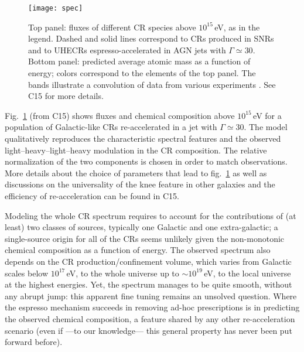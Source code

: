 \documentclass[3p,times,twocolumn]{elsarticle}
\begin{document}
\begin{figure}[t]
\begin{center}
\texttt{[image: spec]}
\caption{Top panel: fluxes of different CR species above $10^{15}$\,eV, as in the legend. 
Dashed and solid lines correspond to CRs produced in SNRs and to UHECRs espresso-accelerated in AGN jets with $\Gamma\simeq 30$.
Bottom panel: predicted average atomic mass as a function of energy; colors correspond to the elements of the top panel.
The bands illustrate a convolution of data from various experiments \citep[][and refs.\ therein]{KU12,GST13,Auger14a,Auger14b}.
See C15 for more details.
}
\label{fig:spec}
\end{center}
\end{figure}

Fig.\ \ref{fig:spec} (from C15) shows fluxes and chemical composition above $10^{15}$\,eV for a population of Galactic-like CRs re-accelerated in a jet with $\Gamma\simeq 30$.
The model qualitatively reproduces the characteristic spectral features and the observed light--heavy--light--heavy modulation in the CR composition.
The relative normalization of the two components is chosen in order to match observations.
More details about the choice of parameters that lead to fig.\ \ref{fig:spec} as well as discussions on the universality of the knee feature in other galaxies and the efficiency of re-acceleration can be found in C15.


Modeling the whole CR spectrum requires to account for the contributions of (at least) two classes of sources, typically one Galactic and one extra-galactic;
a single-source origin for all of the CRs seems unlikely given the non-monotonic chemical composition as a function of energy.
The observed spectrum also depends on the CR production/confinement volume, which varies from Galactic scales below $10^{17}$\,eV, to the whole universe up to $\sim 10^{19}$\,eV, to the local universe at the highest energies. 
Yet, the spectrum manages to be quite smooth, without any abrupt jump: this apparent fine tuning remains an unsolved question.
Where the espresso mechanism succeeds in removing ad-hoc prescriptions is in predicting the observed chemical composition, a feature shared by any other re-acceleration scenario (even if ---to our knowledge--- this general property has never been put forward before).
\end{document}

